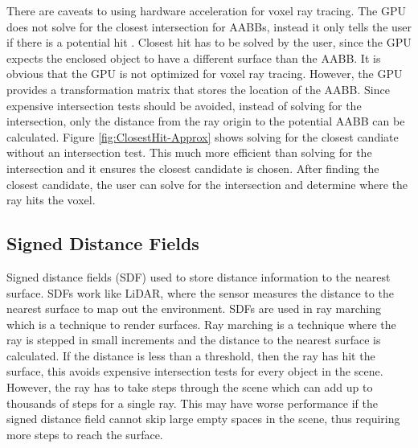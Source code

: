 \documentclass[12pt]{article}
\begin{document}
There are caveats to using hardware acceleration for voxel ray tracing.
The GPU does not solve for the closest intersection for AABBs, instead it only tells the user if there is a potential hit \parencite{DirectX:Specification}.
Closest hit has to be solved by the user, since the GPU expects the enclosed object to have a different surface than the AABB.
It is obvious that the GPU is not optimized for voxel ray tracing.
However, the GPU provides a transformation matrix that stores the location of the AABB.
Since expensive intersection tests should be avoided, instead of solving for the intersection, only the distance from the ray origin to the potential AABB can be calculated.
Figure \ref{fig:ClosestHit-Approx} shows solving for the closest candiate without an intersection test.
This much more efficient than solving for the intersection and it ensures the closest candidate is chosen.
After finding the closest candidate, the user can solve for the intersection and determine where the ray hits the voxel.

\subsection{Signed Distance Fields}

Signed distance fields (SDF) used to store distance information to the nearest surface. 
SDFs work like LiDAR, where the sensor measures the distance to the nearest surface to map out the environment.
SDFs are used in ray marching which is a technique to render surfaces. 
Ray marching is a technique where the ray is stepped in small increments and the distance to the nearest surface is calculated.
If the distance is less than a threshold, then the ray has hit the surface, this avoids expensive intersection tests for every object in the scene.
However, the ray has to take steps through the scene which can add up to thousands of steps for a single ray.
This may have worse performance if the signed distance field cannot skip large empty spaces in the scene, thus
requiring more steps to reach the surface.
\end{document}
